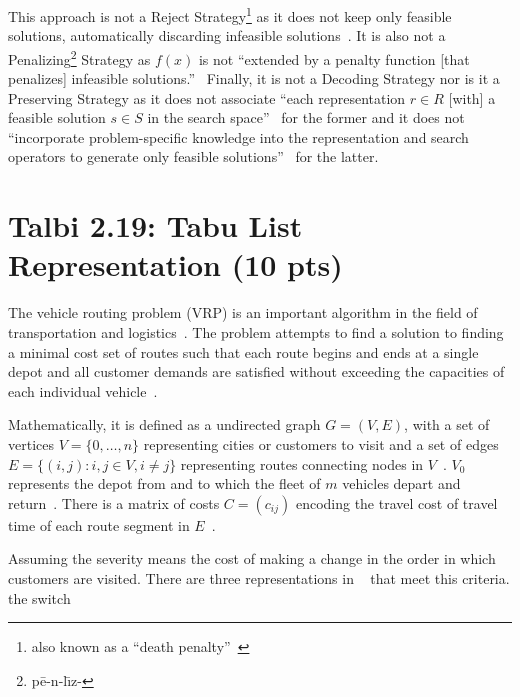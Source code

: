 \documentclass[conference]{../IEEEtran}
\begin{document}
This approach is not a Reject Strategy\footnote{also known as a ``death
penalty''~\cite{talbi2009}} as it does not keep only feasible solutions,
automatically discarding infeasible solutions~\cite[\S1.5.1]{talbi2009}.  It is
also not a
Penalizing\footnote{p\={e}-n-l\={\i}z-}
Strategy as $f(x)$ is not ``extended by a penalty function [that penalizes]
infeasible solutions.''~\cite[\S1.5.2]{talbi2009} Finally, it is not a Decoding
Strategy nor is it a Preserving Strategy as it does not associate ``each
representation $r \in R$ [with] a feasible solution $s \in S$ in the search
space''~\cite[\S1.5.4]{talbi2009} for the former and it does not ``incorporate
problem-specific knowledge into the representation and search operators to
generate only feasible solutions''~\cite[\S1.5.5]{talbi2009} for the latter.




\section{Talbi 2.19: Tabu List Representation (10 pts)} \label{prob2} %

The vehicle routing problem (VRP) is an important algorithm in the field of
transportation and logistics~\cite{talbi2009}.  The problem attempts to find a
solution to finding a minimal cost set of routes such that each route begins
and ends at a single depot and all customer demands are satisfied without
exceeding the capacities of each individual vehicle~\cite{belfiore2008}. 

Mathematically, it is defined as a undirected graph ${G = (V,E)}$, with a set
of vertices ${V = \lbrace 0,\ldots,n \rbrace}$ representing cities or customers
to visit and a set of edges ${E = \lbrace (i,j) : i,j \in V, i \neq j \rbrace}$
representing routes connecting nodes in $V$~\cite{kumar2012}.  $V_0$ represents
the depot from and to which the fleet of $m$ vehicles depart and
return~\cite{kumar2012}.  There is a matrix of costs $C = (c_{ij})$ encoding
the travel cost of travel time of each route segment in
$E$~\cite{belfiore2008,kumar2012,talbi2009,wiki:VRP}.

Assuming the severity means the cost of making a change in the order in which
customers are visited.  There are three representations in ~\cite{toth2003}
that meet this criteria. the switch
\end{document}
